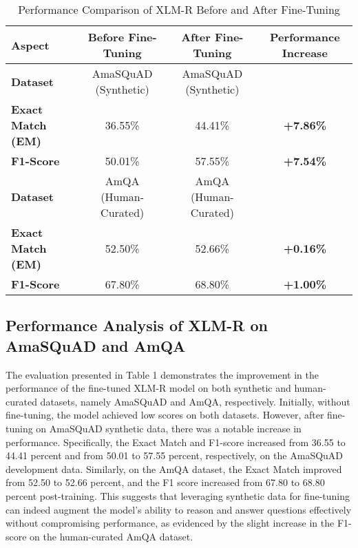 \begin{table*}[h!]
\centering
\begin{tabular}{|l|c|c|c|}
\hline
\textbf{Aspect}           & \textbf{Before Fine-Tuning} & \textbf{After Fine-Tuning} & \textbf{Performance Increase} \\ \hline
\textbf{Dataset}          & AmaSQuAD (Synthetic)       & AmaSQuAD (Synthetic)       &                                \\ \hline
\textbf{Exact Match (EM)} & 36.55\%                    & 44.41\%                    & \textbf{+7.86\%}              \\ \hline
\textbf{F1-Score}         & 50.01\%                    & 57.55\%                    & \textbf{+7.54\%}              \\ \hline
\textbf{Dataset}          & AmQA (Human-Curated)       & AmQA (Human-Curated)       &                                \\ \hline
\textbf{Exact Match (EM)} & 52.50\%                    & 52.66\%                    & \textbf{+0.16\%}              \\ \hline
\textbf{F1-Score}         & 67.80\%                    & 68.80\%                    & \textbf{+1.00\%}              \\ \hline
\end{tabular}
\vspace{1mm}  %
\caption{Performance Comparison of XLM-R Before and After Fine-Tuning}
\label{tab:performance_comparison}
\end{table*}



\subsection{Performance Analysis of XLM-R on AmaSQuAD and AmQA}
The evaluation presented in Table 1 demonstrates the improvement in the performance of the fine-tuned XLM-R model on both synthetic and human-curated datasets, namely AmaSQuAD and AmQA, respectively. Initially, without fine-tuning, the model achieved low scores on both datasets. However, after fine-tuning on AmaSQuAD synthetic data, there was a notable increase in performance. Specifically, the Exact Match and F1-score increased from 36.55 to 44.41 percent and from 50.01 to 57.55 percent, respectively, on the AmaSQuAD development data. Similarly, on the AmQA dataset, the Exact Match improved from 52.50 to 52.66 percent, and the F1 score increased from 67.80 to 68.80 percent post-training. This suggests that leveraging synthetic data for fine-tuning can indeed augment the model's ability to reason and answer questions effectively without compromising performance, as evidenced by the slight increase in the F1-score on the human-curated AmQA dataset.

